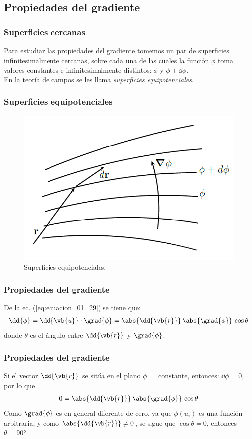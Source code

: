 \subsection{Propiedades del gradiente}
\begin{frame}
\frametitle{Superficies cercanas}
Para estudiar las propiedades del gradiente tomemos un par de superficies infinitesimalmente cercanas, sobre cada una de las cuales la función $\phi$ toma valores constantes e infinitesimalmente distintos: $\phi$ y $\phi + \dd{\phi}$.
\\
\bigskip
\pause
En la teoría de campos se les llama \emph{superficies equipotenciales}.
\end{frame}
\begin{frame}
\frametitle{Superficies equipotenciales}
\begin{figure}[h!]
    \centering
    \includegraphics[scale=0.5]{Imagenes/Superficies_Equipotenciales.png}
    \caption{Superficies equipotenciales.}
    \label{fig:Superficies_Equipotenciales}
\end{figure}
\end{frame}
\begin{frame}
\frametitle{Propiedades del gradiente}
De la ec. (\ref{eq:ecuacion_01_29}) se tiene que:
\begin{align*}
\dd{\phi} = \dd{\vb{u}} \cdot \grad{\phi} = \abs{\dd{\vb{r}}} \, \abs{\grad{\phi}} \, \cos \theta
\end{align*}
donde $\theta$ es el ángulo entre $\dd{\vb{r}}$ y $\grad{\phi}$.
\end{frame}
\begin{frame}
\frametitle{Propiedades del gradiente}
Si el vector $\dd{\vb{r}}$ se sitúa en el plano $\phi = \mbox{ constante}$, entonces: $\dd{\phi} = 0$, por lo que
\begin{align*}
0 = \abs{\dd{\vb{r}}} \, \abs{\grad{\phi}} \, \cos \theta
\end{align*}
\pause
Como $\grad{\phi}$ es en general diferente de cero, ya que $\phi(u_{i})$ es una función arbitraria, y como $\abs{\dd{\vb{r}}} \neq 0$, se sigue que $\cos \theta = 0$, entonces $\theta = \ang{90}$
\end{frame}
